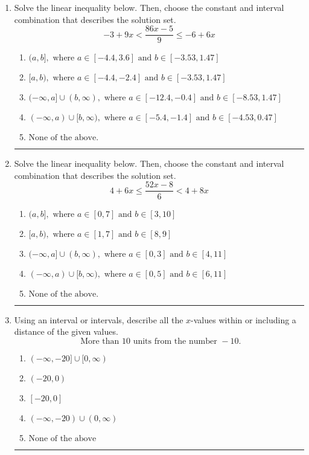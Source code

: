 \documentclass[14pt]{extbook}
\newcommand{\litem}[1]{\item#1\hspace*{-1cm}\rule{\textwidth}{0.4pt}}
\begin{document}
\begin{enumerate}
{\begin{enumerate}[label=\Alph*.]
\end{enumerate} }
\litem{
Solve the linear inequality below. Then, choose the constant and interval combination that describes the solution set.\[ -3 + 9 x < \frac{86 x - 5}{9} \leq -6 + 6 x \]\begin{enumerate}[label=\Alph*.]
\item \( (a, b], \text{ where } a \in [-4.4, 3.6] \text{ and } b \in [-3.53, 1.47] \)
\item \( [a, b), \text{ where } a \in [-4.4, -2.4] \text{ and } b \in [-3.53, 1.47] \)
\item \( (-\infty, a] \cup (b, \infty), \text{ where } a \in [-12.4, -0.4] \text{ and } b \in [-8.53, 1.47] \)
\item \( (-\infty, a) \cup [b, \infty), \text{ where } a \in [-5.4, -1.4] \text{ and } b \in [-4.53, 0.47] \)
\item \( \text{None of the above.} \)

\end{enumerate} }
\litem{
Solve the linear inequality below. Then, choose the constant and interval combination that describes the solution set.\[ 4 + 6 x \leq \frac{52 x - 8}{6} < 4 + 8 x \]\begin{enumerate}[label=\Alph*.]
\item \( (a, b], \text{ where } a \in [0, 7] \text{ and } b \in [3, 10] \)
\item \( [a, b), \text{ where } a \in [1, 7] \text{ and } b \in [8, 9] \)
\item \( (-\infty, a] \cup (b, \infty), \text{ where } a \in [0, 3] \text{ and } b \in [4, 11] \)
\item \( (-\infty, a) \cup [b, \infty), \text{ where } a \in [0, 5] \text{ and } b \in [6, 11] \)
\item \( \text{None of the above.} \)

\end{enumerate} }
\litem{
Using an interval or intervals, describe all the $x$-values within or including a distance of the given values.\[ \text{ More than } 10 \text{ units from the number } -10. \]\begin{enumerate}[label=\Alph*.]
\item \( (-\infty, -20] \cup [0, \infty) \)
\item \( (-20, 0) \)
\item \( [-20, 0] \)
\item \( (-\infty, -20) \cup (0, \infty) \)
\item \( \text{None of the above} \)


\end{enumerate}}
\end{enumerate}
\end{document}
